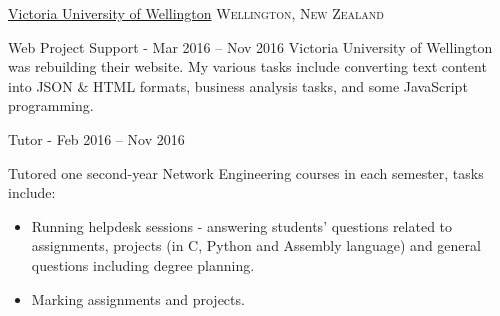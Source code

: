 \documentclass[10pt,a4paper]{article}
\begin{document}
\headedsection  %
  {\href{http://www.victoria.ac.nz/}{Victoria University of Wellington}}
  {\textsc{Wellington, New Zealand}} {
  \headedsubsection
    {Web Project Support - }
    {Mar 2016 -- Nov 2016}
    {\bodytext
      {
        Victoria University of Wellington was rebuilding their website.
        My various tasks include converting text content into JSON \& HTML formats, business analysis tasks, and some JavaScript programming.
      }
    }

  \headedsubsection
    {Tutor - }
    {Feb 2016 -- Nov 2016}
    {\bodytext
      {
        Tutored one second-year Network Engineering courses in each semester, tasks include:
        \begin{itemize}
          \item Running helpdesk sessions - answering students' questions related to assignments, projects (in C, Python and Assembly language) and general questions including degree planning.
          \item Marking assignments and projects.
        \end{itemize}
      }
    }
  }
\end{document}
